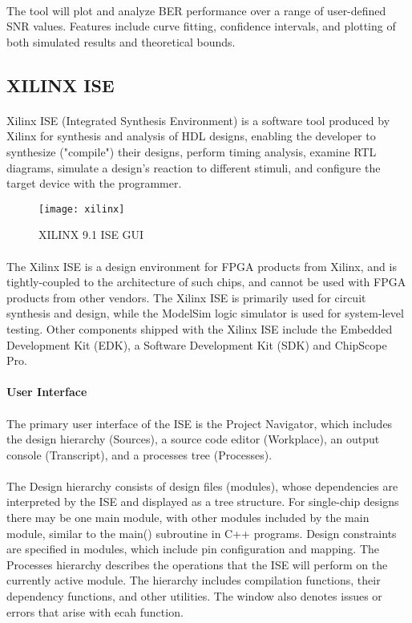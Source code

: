 \documentclass[14pt]{report}
\begin{document}
{\paragraph{} The tool will plot and analyze BER performance over a range of user-defined SNR values. Features include curve fitting, confidence intervals, and plotting of both simulated results and theoretical bounds.
\subsection{XILINX ISE}
\paragraph{} Xilinx ISE (Integrated Synthesis Environment) is a software tool produced by Xilinx for synthesis and analysis of HDL designs, enabling the developer to synthesize ("compile") their designs, perform timing analysis, examine RTL diagrams, simulate a design's reaction to different stimuli, and configure the target device with the programmer.\\
\begin{figure}[ht]
\centering
\texttt{[image: xilinx]}
\caption{XILINX 9.1 ISE GUI}
\end{figure}
\paragraph{} The Xilinx ISE is a design environment for FPGA products from Xilinx, and is tightly-coupled to the architecture of such chips, and cannot be used with FPGA products from other vendors. The Xilinx ISE is primarily used for circuit synthesis and design, while the ModelSim logic simulator is used for system-level testing. Other components shipped with the Xilinx ISE include the Embedded Development Kit (EDK), a Software Development Kit (SDK) and ChipScope Pro.\\
\\
\textbf{User Interface}
\paragraph{} The primary user interface of the ISE is the Project Navigator, which includes the design hierarchy (Sources), a source code editor (Workplace), an output console (Transcript), and a processes tree (Processes).
\paragraph{} The Design hierarchy consists of design files (modules), whose dependencies are interpreted by the ISE and displayed as a tree structure. For single-chip designs there may be one main module, with other modules included by the main module, similar to the main() subroutine in C++ programs. Design constraints are specified in modules, which include pin configuration and mapping. The Processes hierarchy describes the operations that the ISE will perform on the currently active module. The hierarchy includes compilation functions, their dependency functions, and other utilities. The window also denotes issues or errors that arise with ecah function.
}
\end{document}
